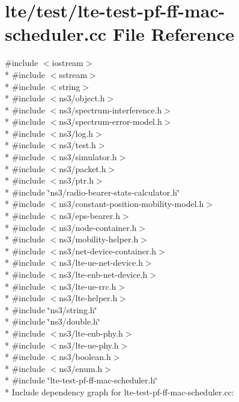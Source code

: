 \hypertarget{lte-test-pf-ff-mac-scheduler_8cc}{}\section{lte/test/lte-\/test-\/pf-\/ff-\/mac-\/scheduler.cc File Reference}
\label{lte-test-pf-ff-mac-scheduler_8cc}
{\ttfamily \#include $<$iostream$>$}\\*
{\ttfamily \#include $<$sstream$>$}\\*
{\ttfamily \#include $<$string$>$}\\*
{\ttfamily \#include $<$ns3/object.\+h$>$}\\*
{\ttfamily \#include $<$ns3/spectrum-\/interference.\+h$>$}\\*
{\ttfamily \#include $<$ns3/spectrum-\/error-\/model.\+h$>$}\\*
{\ttfamily \#include $<$ns3/log.\+h$>$}\\*
{\ttfamily \#include $<$ns3/test.\+h$>$}\\*
{\ttfamily \#include $<$ns3/simulator.\+h$>$}\\*
{\ttfamily \#include $<$ns3/packet.\+h$>$}\\*
{\ttfamily \#include $<$ns3/ptr.\+h$>$}\\*
{\ttfamily \#include \char`\"{}ns3/radio-\/bearer-\/stats-\/calculator.\+h\char`\"{}}\\*
{\ttfamily \#include $<$ns3/constant-\/position-\/mobility-\/model.\+h$>$}\\*
{\ttfamily \#include $<$ns3/eps-\/bearer.\+h$>$}\\*
{\ttfamily \#include $<$ns3/node-\/container.\+h$>$}\\*
{\ttfamily \#include $<$ns3/mobility-\/helper.\+h$>$}\\*
{\ttfamily \#include $<$ns3/net-\/device-\/container.\+h$>$}\\*
{\ttfamily \#include $<$ns3/lte-\/ue-\/net-\/device.\+h$>$}\\*
{\ttfamily \#include $<$ns3/lte-\/enb-\/net-\/device.\+h$>$}\\*
{\ttfamily \#include $<$ns3/lte-\/ue-\/rrc.\+h$>$}\\*
{\ttfamily \#include $<$ns3/lte-\/helper.\+h$>$}\\*
{\ttfamily \#include \char`\"{}ns3/string.\+h\char`\"{}}\\*
{\ttfamily \#include \char`\"{}ns3/double.\+h\char`\"{}}\\*
{\ttfamily \#include $<$ns3/lte-\/enb-\/phy.\+h$>$}\\*
{\ttfamily \#include $<$ns3/lte-\/ue-\/phy.\+h$>$}\\*
{\ttfamily \#include $<$ns3/boolean.\+h$>$}\\*
{\ttfamily \#include $<$ns3/enum.\+h$>$}\\*
{\ttfamily \#include \char`\"{}lte-\/test-\/pf-\/ff-\/mac-\/scheduler.\+h\char`\"{}}\\*
Include dependency graph for lte-\/test-\/pf-\/ff-\/mac-\/scheduler.cc\+:
